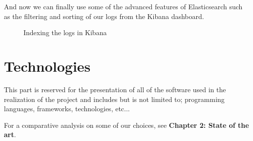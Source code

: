 And now we can finally use some of the advanced features of Elasticsearch such as the filtering and sorting of our logs from the Kibana dashboard.

\begin{figure}[H]
    \centering
    \caption{Indexing the logs in Kibana}
    \label{fig:kibana-logs-indexing}
\end{figure}

\newpage

\section{Technologies}
This part is reserved for the presentation of all of the software used in the realization of the project and includes but is not limited to; programming languages, frameworks, technologies, etc...

\medskip
For a comparative analysis on some of our choices, see \textbf {Chapter 2: State of the art}.

